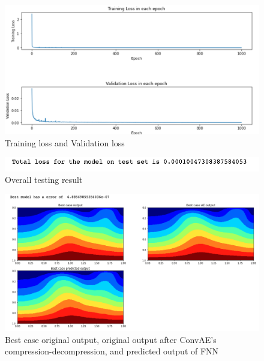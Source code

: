 \begin{figure}[H]
    \caption{Training loss and Validation loss}
    \includegraphics[scale=0.6]{Report LaTeX/figures/mantle_convection_images/limited_dataset/FNN_trainingData.png}
\end{figure}

\begin{figure}[H]
    \caption{Overall testing result}
    \includegraphics[scale=0.8]{Report LaTeX/figures/mantle_convection_images/limited_dataset/FNN_OverallTesting.png}
\end{figure}

\begin{figure}[H]
    \caption{Best case original output, original output after ConvAE's compression-decompression, and predicted output of FNN}
    \includegraphics[scale=0.5]{Report LaTeX/figures/mantle_convection_images/limited_dataset/FNN_Best.png}
\end{figure}

